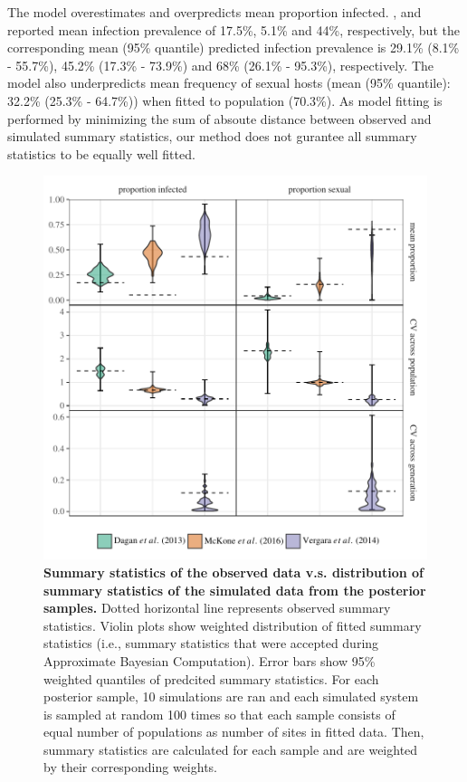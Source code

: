 \documentclass{article}\usepackage[]{graphicx}\usepackage[]{color}
\begin{document}
The model overestimates and overpredicts mean proportion infected.
\cite{dagan2013clonal}, \cite{mckone2016fine} and \cite{vergara2014infection} reported mean infection prevalence of 17.5\%, 5.1\% and 44\%, respectively, but the corresponding mean (95\% quantile) predicted infection prevalence is 29.1\% (8.1\% - 55.7\%), 45.2\% (17.3\% - 73.9\%) and 68\% (26.1\% - 95.3\%), respectively.
The model also underpredicts mean frequency of sexual hosts (mean (95\% quantile): 32.2\% (25.3\% - 64.7\%)) when fitted to \cite{vergara2014infection} population (70.3\%).
As model fitting is performed by minimizing the sum of absoute distance between observed and simulated summary statistics, our method does not gurantee all summary statistics to be equally well fitted.

\begin{figure}[!ht]
\includegraphics[width=\textwidth]{../fig/smc_summary.pdf}
\caption{{\bf Summary statistics of the observed data v.s. distribution of summary statistics of the simulated data from the posterior samples.}
Dotted horizontal line represents observed summary statistics.
Violin plots show weighted distribution of fitted summary statistics (i.e., summary statistics that were accepted during Approximate Bayesian Computation). 
Error bars show 95\% weighted quantiles of predcited summary statistics.
For each posterior sample, 10 simulations are ran and each simulated system is sampled at random 100 times so that each sample consists of equal number of populations as number of sites in fitted data. 
Then, summary statistics are calculated for each sample and are weighted by their corresponding weights.
}
\label{fig:smcsumm}
\end{figure}
\end{document}
